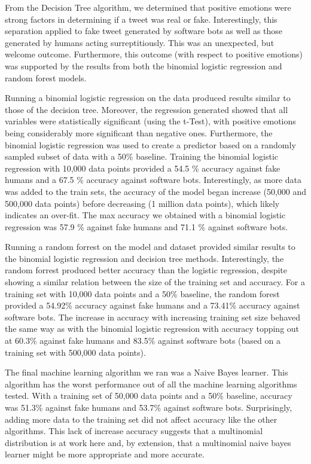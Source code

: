 \documentclass{article}[12pt]
\numberwithin{equation}{subsection}
\begin{document}
\begin{flushleft}
From the Decision Tree algorithm, we determined that positive emotions were strong factors in determining if a tweet was real or fake.  Interestingly, this separation applied to fake tweet generated by software bots as well as those generated by humans acting surreptitiously.  This was an unexpected, but welcome outcome.  Furthermore, this outcome (with respect to positive emotions) was supported by the results from both the binomial logistic regression and random forest models. \newline

Running a binomial logistic regression on the data produced results similar to those of the decision tree.  Moreover, the regression generated showed that all variables were statistically significant (using the t-Test), with positive emotions being considerably more significant than negative ones.  Furthermore, the binomial logistic regression was used to create a predictor based on a randomly sampled subset of data with a 50\% baseline.  Training the binomial logistic regression with 10,000 data points provided a 54.5 \% accuracy against fake humans and a 67.5 \% accuracy against software bots.  Interestingly, as more data was added to the train sets, the accuracy of the model began increase (50,000 and 500,000 data points) before decreasing (1 million data points), which likely indicates an over-fit.  The max accuracy we obtained with a binomial logistic regression was 57.9 \% against fake humans and 71.1 \% against software bots. \newline

Running a random forrest on the model and dataset provided similar results to the binomial logistic regression and decision tree methods.  Interestingly, the random forrest produced better accuracy than the logistic regression, despite showing a similar relation between the size of the training set and accuracy.  For a training set with 10,000 data points and a 50\% baseline, the random forest provided a 54.92\% accuracy against fake humans and a 73.41\% accuracy against software bots.  The increase in accuracy with increasing training set size behaved the same way as with the binomial logistic regression with accuracy topping out at 60.3\% against fake humans and 83.5\% against software bots (based on a training set with 500,000 data points). \newline

The final machine learning algorithm we ran was a Naive Bayes learner.  This algorithm has the worst performance out of all the machine learning algorithms tested.  With a training set of 50,000 data points and a 50\% baseline, accuracy was 51.3\% against fake humans and 53.7\% against software bots.  Surprisingly, adding more data to the training set did not affect accuracy like the other algorithms.  This lack of increase accuracy suggests that a multinomial distribution is at work here and, by extension, that a multinomial naive bayes learner might be more appropriate and more accurate. 



\end{flushleft}
\end{document}
